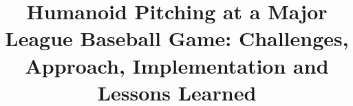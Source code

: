 \documentclass[conference]{IEEEtran}
\begin{document}
%
\title{Humanoid Pitching at a Major League Baseball Game: Challenges, Approach, Implementation and Lessons Learned}


%


%
%
%
%

%



\linespread{0.8}


%
{}
  




\end{document}
